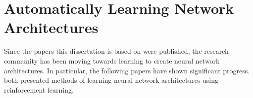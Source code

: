 \documentclass[thesis]{subfiles}
\begin{document}
\section[Automatically Learning Network Architectures]{Automatically Learning Network\texorpdfstring{\\}{ }Architectures}
Since the papers this dissertation is based on were published, the research community has been moving towards learning to create neural network architectures. In particular, the following papers have shown significant progress.
\citet{baker2017, zoph2017} both presented methods of learning neural network architectures using reinforcement learning. 
\end{document}
